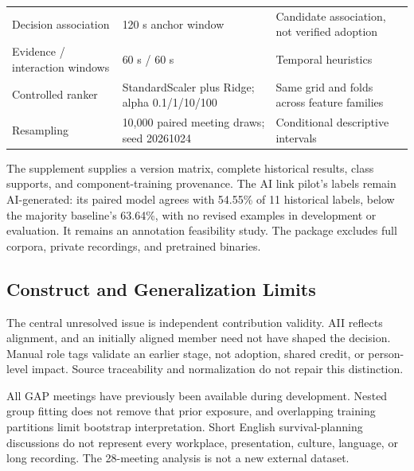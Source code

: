 \documentclass[journal]{IEEEtran}
\begin{document}
\begin{table}[t]
\begin{tabular}{p{}p{}p{}}
{\raggedright Decision association\par} & {\raggedright 120 s anchor window\par} & {\raggedright Candidate association, not verified adoption\par} \\
{\raggedright Evidence / interaction windows\par} & {\raggedright 60 s / 60 s\par} & {\raggedright Temporal heuristics\par} \\
{\raggedright Controlled ranker\par} & {\raggedright StandardScaler plus Ridge; alpha 0.1/1/10/100\par} & {\raggedright Same grid and folds across feature families\par} \\
{\raggedright Resampling\par} & {\raggedright 10,000 paired meeting draws; seed 20261024\par} & {\raggedright Conditional descriptive intervals\par} \\
\bottomrule
\end{tabular}
\end{table}
The supplement supplies a version matrix, complete historical results, class supports, and component-training provenance. The AI link pilot's labels remain AI-generated: its paired model agrees with 54.55\% of 11 historical labels, below the majority baseline's 63.64\%, with no revised examples in development or evaluation. It remains an annotation feasibility study. The package excludes full corpora, private recordings, and pretrained binaries.

\subsection{Construct and Generalization Limits}
The central unresolved issue is independent contribution validity. AII reflects alignment, and an initially aligned member need not have shaped the decision. Manual role tags validate an earlier stage, not adoption, shared credit, or person-level impact. Source traceability and normalization do not repair this distinction.

All GAP meetings have previously been available during development. Nested group fitting does not remove that prior exposure, and overlapping training partitions limit bootstrap interpretation. Short English survival-planning discussions do not represent every workplace, presentation, culture, language, or long recording. The 28-meeting analysis is not a new external dataset.
\end{document}
